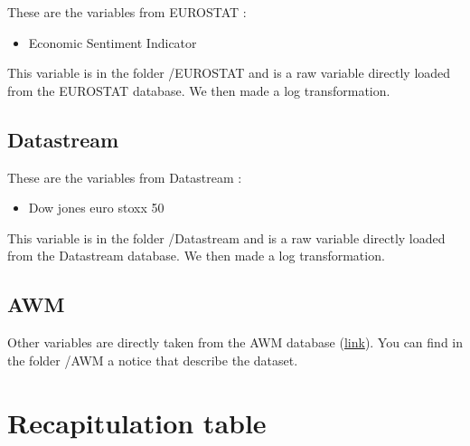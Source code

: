 \documentclass[11pt,a4paper]{article}
\begin{document}
These are the variables from EUROSTAT :
\begin{itemize}
\item Economic Sentiment Indicator
\end{itemize}

\vspace{0.5cm}

This variable is in the folder /EUROSTAT and is a raw variable directly loaded from the EUROSTAT database. We then made a log transformation. 

\subsection{Datastream}

These are the variables from Datastream :
\begin{itemize}
\item Dow jones euro stoxx 50
\end{itemize}

\vspace{0.5cm}

This variable is in the folder /Datastream and is a raw variable directly loaded from the Datastream database. We then made a log transformation. 


\subsection{AWM}

Other variables are directly taken from the AWM database (\href{http://www.eabcn.org/page/area-wide-model}{link}). You can find in the folder /AWM a notice that describe the dataset. 



\section{Recapitulation table}
\end{document}
